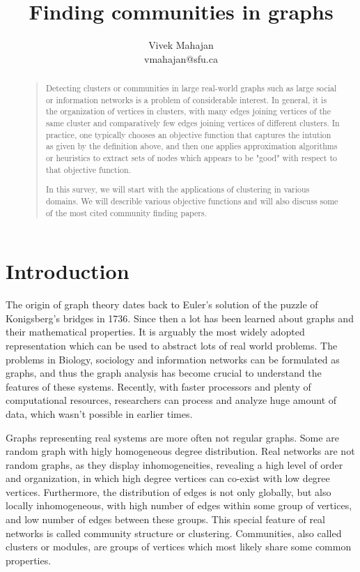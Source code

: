 \documentclass[letterpaper]{article}
\begin{document}
%
\title{Finding communities in graphs}
\author{Vivek Mahajan\\
vmahajan@sfu.ca\\
}
\maketitle
\begin{abstract}
\begin{quote}
Detecting clusters or communities in large real-world graphs such as large
social or information networks is a problem of considerable interest. In
general, it is the organization of vertices in clusters, with many edges
joining vertices of the same cluster and comparatively few edges joining
vertices of different clusters.  In practice, one typically chooses an
objective function that captures the intution as given by the definition above,
and then one applies approximation algorithms or heuristics to extract sets of
nodes which appears to be "good" with respect to that objective function.

In this survey, we will start with the applications of clustering in various
domains. We will describle various objective functions and will also discuss
some of the most cited community finding papers. 

\end{quote}
\end{abstract}

\section{Introduction}
The origin of graph theory dates back to Euler's solution of the puzzle of
Konigsberg's bridges in 1736.  Since then a lot has been learned about graphs
and their mathematical properties. It is arguably the most widely adopted
representation which can be used to abstract lots of  real world problems. The
problems in Biology, sociology and information networks can be formulated as
graphs, and thus the graph analysis has become crucial to understand the
features of these systems. Recently, with faster processors and plenty of
computational resources, researchers can process and analyze huge amount of
data, which wasn't possible in earlier times.

Graphs representing real systems are more often not regular graphs. Some are
random graph with higly homogeneous degree distribution. Real networks are not
random graphs, as they display inhomogeneities, revealing a high level of order
and organization, in which high degree vertices can co-exist with low degree
vertices. Furthermore, the distribution of edges is not only globally, but also
locally inhomogeneous, with high number of edges within some group of vertices,
and low number of edges between these groups. This special feature of real
networks is called community structure or clustering. Communities, also called
clusters or modules, are groups of vertices which most likely share some common
properties. 
\end{document}
